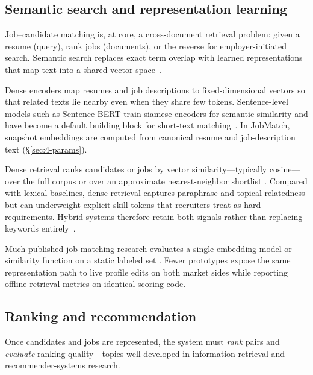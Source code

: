 \subsection{Semantic search and representation learning}\label{sec:2-semantic}

Job--candidate matching is, at core, a cross-document retrieval problem: given a resume (query), rank jobs (documents), or the reverse for employer-initiated search.
Semantic search replaces exact term overlap with learned representations that map text into a shared vector space~\cite{Manning2008}.

Dense encoders map resumes and job descriptions to fixed-dimensional vectors so that related texts lie nearby even when they share few tokens.
Sentence-level models such as Sentence-BERT train siamese encoders for semantic similarity and have become a default building block for short-text matching~\cite{Reimers2019}.
In JobMatch, snapshot embeddings are computed from canonical resume and job-description text (\S\ref{sec:4-params}).

Dense retrieval ranks candidates or jobs by vector similarity---typically cosine---over the full corpus or over an approximate nearest-neighbor shortlist .
Compared with lexical baselines, dense retrieval captures paraphrase and topical relatedness but can underweight explicit skill tokens that recruiters treat as hard requirements.
Hybrid systems therefore retain both signals rather than replacing keywords entirely~\cite{Manning2008,Reimers2019}.

Much published job-matching research evaluates a single embedding model or similarity function on a static labeled set .
Fewer prototypes expose the same representation path to live profile edits on both market sides while reporting offline retrieval metrics on identical scoring code.

\subsection{Ranking and recommendation}\label{sec:2-ranking}

Once candidates and jobs are represented, the system must \emph{rank} pairs and \emph{evaluate} ranking quality---topics well developed in information retrieval and recommender-systems research.

